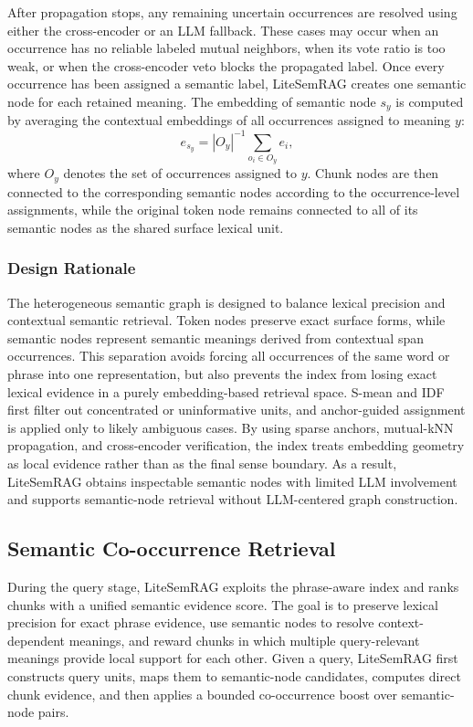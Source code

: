 \documentclass[conference]{IEEEtran}
\begin{document}
After propagation stops, any remaining uncertain occurrences are resolved using either the cross-encoder or an LLM fallback. These cases may occur when an occurrence has no reliable labeled mutual neighbors, when its vote ratio is too weak, or when the cross-encoder veto blocks the propagated label. Once every occurrence has been assigned a semantic label, LiteSemRAG creates one semantic node for each retained meaning. The embedding of semantic node $s_y$ is computed by averaging the contextual embeddings of all occurrences assigned to meaning $y$:
\[
e_{s_y} = |O_y|^{-1} \sum_{o_i \in O_y} e_i,
\]
where $O_y$ denotes the set of occurrences assigned to $y$. Chunk nodes are then connected to the corresponding semantic nodes according to the occurrence-level assignments, while the original token node remains connected to all of its semantic nodes as the shared surface lexical unit.

\subsubsection{Design Rationale}
The heterogeneous semantic graph is designed to balance lexical precision and contextual semantic retrieval. Token nodes preserve exact surface forms, while semantic nodes represent semantic meanings derived from contextual span occurrences. This separation avoids forcing all occurrences of the same word or phrase into one representation, but also prevents the index from losing exact lexical evidence in a purely embedding-based retrieval space. S-mean and IDF first filter out concentrated or uninformative units, and anchor-guided assignment is applied only to likely ambiguous cases. By using sparse anchors, mutual-kNN propagation, and cross-encoder verification, the index treats embedding geometry as local evidence rather than as the final sense boundary. As a result, LiteSemRAG obtains inspectable semantic nodes with limited LLM involvement and supports semantic-node retrieval without LLM-centered graph construction.

\subsection{Semantic Co-occurrence Retrieval}

During the query stage, LiteSemRAG exploits the phrase-aware index and ranks chunks with a unified semantic evidence score. The goal is to preserve lexical precision for exact phrase evidence, use semantic nodes to resolve context-dependent meanings, and reward chunks in which multiple query-relevant meanings provide local support for each other. Given a query, LiteSemRAG first constructs query units, maps them to semantic-node candidates, computes direct chunk evidence, and then applies a bounded co-occurrence boost over semantic-node pairs.
\end{document}
